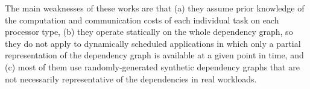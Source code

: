 
The main weaknesses of these works are that (a) they assume prior knowledge of the computation and communication costs of each individual task on each processor type, (b) they operate statically on the whole dependency graph, so they do not apply to dynamically scheduled applications in which only a partial representation of the dependency graph is available at a given point in time, and (c) most of them use randomly-generated synthetic dependency graphs that are not necessarily representative of the dependencies in real workloads.


\fi

